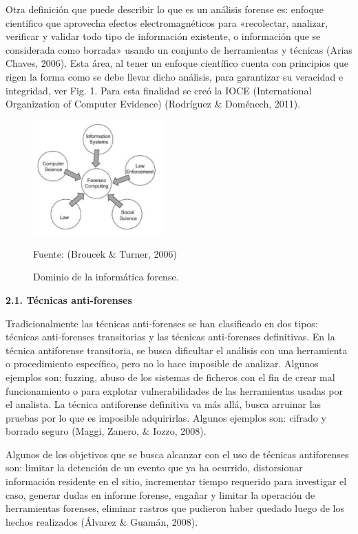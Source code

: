 \documentclass[times,5p, twocolumn]{elsarticle}
\begin{document}
Otra definición que puede describir lo que
es un análisis forense es: enfoque científico
que aprovecha efectos electromagnéticos
para «recolectar, analizar, verificar y
validar todo tipo de información existente,
o información que se considerada como
borrada» usando un conjunto de
herramientas y técnicas (Arias Chaves,
2006). Esta área, al tener un enfoque
científico cuenta con principios que rigen
la forma como se debe llevar dicho
análisis, para garantizar su veracidad e
integridad, ver Fig. 1. Para esta finalidad
se creó la IOCE (International
Organization of Computer Evidence)
(Rodríguez & Doménech, 2011).

\begin{figure}[h]
    \centering
    \includegraphics[width=5cm]{articulo.png}
    \caption{Dominio de la informática forense. } Fuente: (Broucek & Turner, 2006)
\end{figure}

\textbf{2.1. Técnicas anti-forenses}

Tradicionalmente las técnicas anti-forenses
se han clasificado en dos tipos: técnicas
anti-forenses transitorias y las técnicas
anti-forenses definitivas. En la técnica antiforense transitoria, se busca dificultar el
análisis con una herramienta o
procedimiento específico, pero no lo hace
imposible de analizar. Algunos ejemplos
son: fuzzing, abuso de los sistemas de
ficheros con el fin de crear mal
funcionamiento o para explotar
vulnerabilidades de las herramientas
usadas por el analista. La técnica antiforense definitiva va más allá, busca
arruinar las pruebas por lo que es
imposible adquirirlas. Algunos ejemplos
son: cifrado y borrado seguro (Maggi,
Zanero, & Iozzo, 2008).

Algunos de los objetivos que se busca
alcanzar con el uso de técnicas antiforenses son: limitar la detención de un
evento que ya ha ocurrido, distorsionar
información residente en el sitio,
incrementar tiempo requerido para
investigar el caso, generar dudas en
informe forense, engañar y limitar la
operación de herramientas forenses,
eliminar rastros que pudieron haber
quedado luego de los hechos realizados
(Álvarez & Guamán, 2008).
\end{document}
